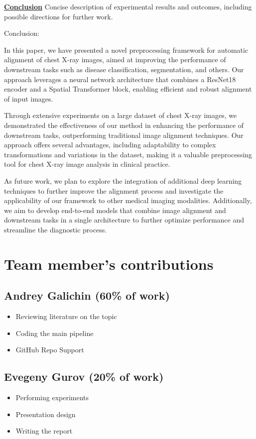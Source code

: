 \documentclass{article}
\begin{document}
\underline{\textbf{Conclusion}} Concise description of experimental results and outcomes, including possible directions for further work.

Conclusion:

In this paper, we have presented a novel preprocessing framework for automatic alignment of chest X-ray images, aimed at improving the performance of downstream tasks such as disease classification, segmentation, and others. Our approach leverages a neural network architecture that combines a ResNet18 encoder and a Spatial Transformer block, enabling efficient and robust alignment of input images.

Through extensive experiments on a large dataset of chest X-ray images, we demonstrated the effectiveness of our method in enhancing the performance of downstream tasks, outperforming traditional image alignment techniques. Our approach offers several advantages, including adaptability to complex transformations and variations in the dataset, making it a valuable preprocessing tool for chest X-ray image analysis in clinical practice.

As future work, we plan to explore the integration of additional deep learning techniques to further improve the alignment process and investigate the applicability of our framework to other medical imaging modalities. Additionally, we aim to develop end-to-end models that combine image alignment and downstream tasks in a single architecture to further optimize performance and streamline the diagnostic process.



\clearpage

\newpage
\appendix
\section{Team member's contributions}
\label{appendix-contrib}

\subsection*{Andrey Galichin (60\% of work)}
\begin{itemize}
    \item Reviewing literature on the topic
    \item Coding the main pipeline
    \item GitHub Repo Support
\end{itemize}

\subsection*{Evegeny Gurov (20\% of work)}
\begin{itemize}
    \item Performing experiments
    \item Presentation design
    \item Writing the report
\end{itemize}
\end{document}
